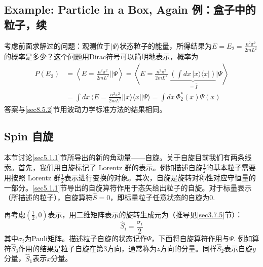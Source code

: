 \subsection[例：盒子中的粒子，续]{Example: Particle in a Box, Again \quad 例：盒子中的粒子，续}
\label{sec8.5.4}
考虑前面求解过的问题：观测位于$|\Psi\rangle$状态粒子的能量，所得结果为$E = E_2 = \frac{n^2 \pi^2}{2mL^2}$的概率是多少？这个问题用Dirac符号可以简明地表示，概率为
\begin{align*}
	P(E_2) &= \left\langle E = \frac{n^2 \pi^2}{2mL^2} \bigg|\bigg| \Psi \right\rangle = \left\langle E = \frac{n^2 \pi^2}{2mL^2} \bigg| \underbrace{ \left( \int dx\, |x\rangle \langle x| \right) }_{= \hat{I}} \bigg| \Psi \right\rangle \\
	&= \int dx\, \langle E = \frac{n^2 \pi^2}{2mL^2} || x \rangle \langle x || \Psi \rangle = \int dx\, \Phi_2^* (x) \Psi(x)
\end{align*}
答案与\ref{sec8.5.2}节用波动力学标准方法的结果相同。


\subsection[自旋]{Spin 自旋}
\label{sec8.5.5}
本节讨论\ref{sec5.1.1}节所导出的新的角动量——自旋。关于自旋目前我们有两条线索。首先，我们用自旋标记了 Lorentz 群的表示。例如描述自旋$\frac{1}{2}$的基本粒子需要用按照 Lorentz 群$\frac{1}{2}$表示进行变换的对象。其次，自旋是旋转对称性对应守恒量的一部分。\ref{sec5.1.1}节导出的自旋算符作用于态矢给出粒子的自旋。对于标量表示（所描述的粒子），自旋算符$\hat{S} = 0$，即标量粒子任意状态的自旋为$0$.

再考虑$(\frac{1}{2}, 0)$表示，用二维矩阵表示的旋转生成元为（推导见\ref{sec3.7.5}节）：
\begin{equation}
\label{equ8.45}
	\hat{S}_i = \frac{\sigma_i}{2}
\end{equation}
其中$\sigma_i$为Pauli矩阵。描述粒子自旋的状态记作$\Psi$，下面将自旋算符作用与$\Psi$. 例如算符$\hat{S}_3$作用的结果是粒子自旋在第$3$方向，通常称为$z$方向的分量。同样$\hat{S}_2$表示自旋$y$分量，$\hat{S}_1$表示$x$分量。


